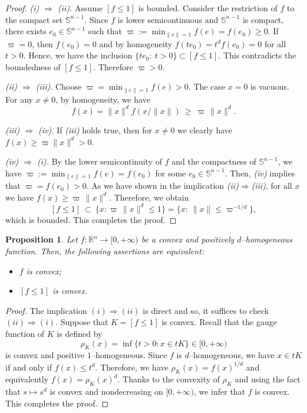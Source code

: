 \documentclass[11pt]{article}
\newtheorem{proposition}[theorem]{Proposition}
\theoremstyle{definition}
\numberwithin{equation}{section}
\newcommand{\R}{\mathbb{R}}
\newcommand{\Sph}{\mathbb{S}}        %
\begin{document}
\begin{proof}
\noindent\textit{(i) $\Longrightarrow$ (ii).}
Assume $[f\le1]$ is bounded. Consider the restriction of $f$ to the compact set $\Sph^{n-1}$.
Since $f$ is lower semicontinuous and $\Sph^{n-1}$ is compact, there exists $e_0 \in \Sph^{n - 1}$ such that $\varpi := \textstyle\min_{\|e\|=1} f(e) = f(e_0) \geq 0$.
If $\varpi = 0$, then $f(e_0)  = 0$ and by homogeneity
$f(te_0)=t^d f(e_0)=0$ for all $t > 0$.
Hence, we have the inclusion $\{t e_0:\ t>0\}\subset [f\le1]$.
This contradicts the boundedness of $[f\le1]$. 
Therefore $\varpi > 0$.

\medskip
\noindent\textit{(ii) $\Longrightarrow$ (iii).}
Choose $\varpi = \textstyle\min_{\|e\|=1} f(e)>0$. 
The case $x = 0$ is vacuous.
For any $x \neq 0$, by homogeneity, we have
\[
f(x)=\|x\|^d f(x/\|x\|)\ \ge\ \varpi \,\|x\|^d.
\]

\medskip
\noindent\textit{(iii) $\Longrightarrow$ (iv).}
If \textit{(iii)} holds true, then for $x\neq0$ we clearly have $f(x)\ge \varpi \|x\|^d>0$.

\medskip
\noindent\textit{(iv) $\Longrightarrow$ (i).}
By the lower semicontinuity of $f$ and the compactness of $\mathbb S^{n - 1}$, we have $\varpi := \textstyle\min_{\|e\|=1} f(e) = f(e_0)$ for some $e_0 \in \Sph^{n - 1}$.
Then, \textit{(iv)} implies that $\varpi = f(e_0) > 0$.
As we have shown in  the implication \textit{(ii)$\Longrightarrow$(iii)}, for all $x$ we have
$f(x)\ge \varpi \,\|x\|^d$. 
Therefore, we obtain
\[
[f\le1]\ \subset\ \big\{ x: \varpi \,\|x\|^d\le 1 \big\}
= \big\{x:\ \|x\|\le \varpi^{-1/d} \big\},
\]
which is bounded. 
This completes the proof.
\end{proof}

\begin{proposition}
    Let $f: \R^n \to [0, + \infty)$ be a convex and positively $d$--homogeneous function.
    Then, the following assertions are equivalent:
    \begin{itemize}
        \item[(i)] $f$ is convex;

        \item[(ii)] $[f \leq 1]$ is convex.
    \end{itemize}
\end{proposition}

\begin{proof}
The implication $(i) \Longrightarrow (ii)$ is direct and so, it suffices to check $(ii) \Longrightarrow (i)$.
Suppose that $K = [f \leq 1]$ is convex.
Recall that the gauge function of $K$ is defined by
\[
    \rho_K(x) = \inf \big\{ t > 0: x \in t K  \big\} \in [0, + \infty)
\]
is convex and positive $1$--homogeneous.
Since $f$ is $d$--homogeneous, we have $x \in tK$ if and only if $f(x) \leq t^d$. 
Therefore, we have $\rho_K(x) = f(x)^{1/d}$ and equivalently $f(x) = \rho_K(x)^d$.
Thanks to the convexity of $\rho_K$ and using the fact that $s \mapsto s^d$ is convex and nondecreasing on $[0, + \infty)$, we infer that $f$ is convex. 
This completes the proof.
\end{proof}
\end{document}
